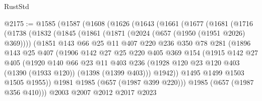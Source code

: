 \begin{lexlean}{RustStd}
\begin{coremodule}
@2175 := @1585
    (@1587
      (@1608
        (@1626
          (@1643
            (@1661
              (@1677
                (@1681
                  (@1716
                    (@1738
                      (@1832
                        (@1845
                          (@1861
                            (@1871 (@2024 (@657 (@1950 (@1951 @2026) @369))))
                            (@1851
                              @143
                              @66
                              @25
                              @11
                              @407
                              @220
                              @236
                              @350
                              @78
                              @281
                              (@1896
                                @143
                                @25
                                @407
                                (@1906
                                  @142
                                  @27
                                  @25
                                  @220
                                  @405
                                  @369
                                  @154
                                  (@1915
                                    @142
                                    @27
                                    @405
                                    (@1920
                                      @140
                                      @66
                                      @23
                                      @11
                                      @403
                                      @236
                                      (@1928
                                        @120
                                        @23
                                        @120
                                        @403
                                        (@1390 (@1933 @120))
                                        (@1398 (@1399 @403)))
                                      @1942))
                                  @1495
                                  @1499
                                  @1503
                                  @1505
                                  @1955))
                              @1981
                              @1985
                              (@657 (@1987 @399 @220)))
                            @1985
                            (@657 (@1987 @356 @410)))
                          @2003
                          @2007
                          @2012
                          @2017
                          @2023

\end{coremodule}
\end{lexlean}
